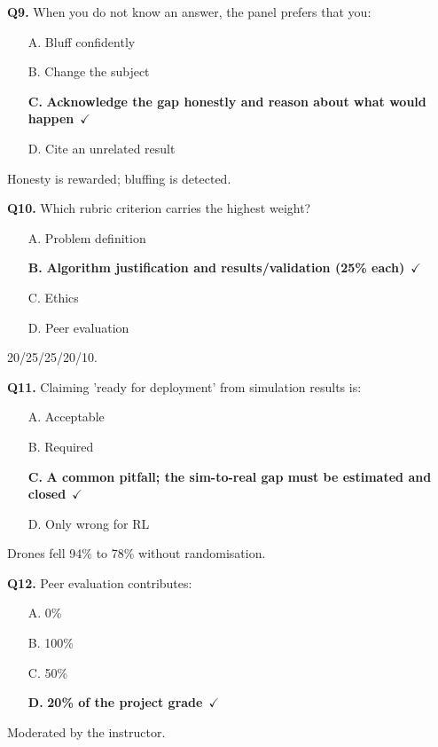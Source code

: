 \documentclass[11pt]{article}
\begin{document}
{\noindent\textbf{Q9.} When you do not know an answer, the panel prefers that you:\begin{itemize}[leftmargin=2.2em,itemsep=0pt,topsep=1pt]\item[A.] Bluff confidently\item[B.] Change the subject\item[\textbf{C.}] \textbf{Acknowledge the gap honestly and reason about what would happen}~{\color{GrnN}$\checkmark$}\item[D.] Cite an unrelated result\end{itemize} Honesty is rewarded; bluffing is detected.\par\medskip

\noindent\textbf{Q10.} Which rubric criterion carries the highest weight?\begin{itemize}[leftmargin=2.2em,itemsep=0pt,topsep=1pt]\item[A.] Problem definition\item[\textbf{B.}] \textbf{Algorithm justification and results/validation (25\% each)}~{\color{GrnN}$\checkmark$}\item[C.] Ethics\item[D.] Peer evaluation\end{itemize} 20/25/25/20/10.\par\medskip

\noindent\textbf{Q11.} Claiming 'ready for deployment' from simulation results is:\begin{itemize}[leftmargin=2.2em,itemsep=0pt,topsep=1pt]\item[A.] Acceptable\item[B.] Required\item[\textbf{C.}] \textbf{A common pitfall; the sim-to-real gap must be estimated and closed}~{\color{GrnN}$\checkmark$}\item[D.] Only wrong for RL\end{itemize} Drones fell 94\% to 78\% without randomisation.\par\medskip

\noindent\textbf{Q12.} Peer evaluation contributes:\begin{itemize}[leftmargin=2.2em,itemsep=0pt,topsep=1pt]\item[A.] 0\%\item[B.] 100\%\item[C.] 50\%\item[\textbf{D.}] \textbf{20\% of the project grade}~{\color{GrnN}$\checkmark$}\end{itemize} Moderated by the instructor.\par\medskip

}
\end{document}
